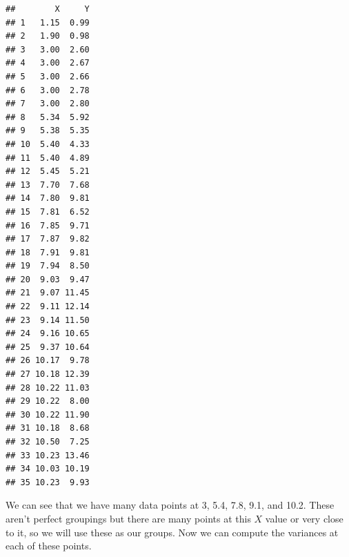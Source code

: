\documentclass[
  11pt,
]{article}
\begin{document}
\begin{verbatim}
##        X     Y
## 1   1.15  0.99
## 2   1.90  0.98
## 3   3.00  2.60
## 4   3.00  2.67
## 5   3.00  2.66
## 6   3.00  2.78
## 7   3.00  2.80
## 8   5.34  5.92
## 9   5.38  5.35
## 10  5.40  4.33
## 11  5.40  4.89
## 12  5.45  5.21
## 13  7.70  7.68
## 14  7.80  9.81
## 15  7.81  6.52
## 16  7.85  9.71
## 17  7.87  9.82
## 18  7.91  9.81
## 19  7.94  8.50
## 20  9.03  9.47
## 21  9.07 11.45
## 22  9.11 12.14
## 23  9.14 11.50
## 24  9.16 10.65
## 25  9.37 10.64
## 26 10.17  9.78
## 27 10.18 12.39
## 28 10.22 11.03
## 29 10.22  8.00
## 30 10.22 11.90
## 31 10.18  8.68
## 32 10.50  7.25
## 33 10.23 13.46
## 34 10.03 10.19
## 35 10.23  9.93
\end{verbatim}

We can see that we have many data points at 3, 5.4, 7.8, 9.1, and 10.2.
These aren't perfect groupings but there are many points at this \(X\)
value or very close to it, so we will use these as our groups. Now we
can compute the variances at each of these points.
\end{document}
